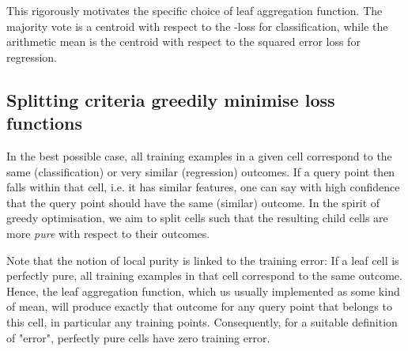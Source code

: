 \documentclass[../main.tex]{subfiles}
\begin{document}
This rigorously motivates the specific choice of leaf aggregation function. The majority vote is a centroid with respect to the \zeroone-loss for classification, while the arithmetic mean is the centroid with respect to the squared error loss for regression.



\subsection{Splitting criteria greedily minimise loss functions}

In the best possible case, all training examples in a given cell correspond to the same (classification) or very similar (regression) outcomes. If a query point then falls within that cell, i.e. it has similar features, one can say with high confidence that the query point should have the same (similar) outcome. In the spirit of greedy optimisation, we aim to split cells such that the resulting child cells are more \textit{pure} with respect to their outcomes. 

Note that the notion of local purity is linked to the training error: If a leaf cell is perfectly pure, all training examples in that cell correspond to the same outcome. Hence, the leaf aggregation function, which us usually implemented as some kind of mean, will produce exactly that outcome for any query point that belongs to this cell, in particular any training points. Consequently, for a suitable definition of "error", perfectly pure cells have zero training error.


\end{document}
